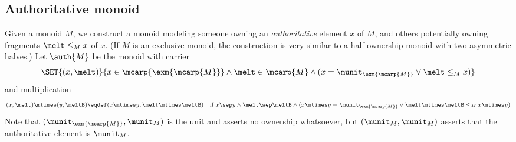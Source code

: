 %
%
%
%

\subsection{Authoritative monoid}\label{sec:auth}

Given a monoid $M$, we construct a monoid modeling someone owning an \emph{authoritative} element $x$ of $M$, and others potentially owning fragments $\melt \le_M x$ of $x$.
(If $M$ is an exclusive monoid, the construction is very similar to a half-ownership monoid with two asymmetric halves.)
Let $\auth{M}$ be the monoid with carrier
\[
	\SET{ (x, \melt) }{ x \in \mcarp{\exm{\mcarp{M}}} \land \melt \in \mcarp{M} \land (x = \munit_{\exm{\mcarp{M}}} \lor \melt \leq_M x) }
\]
and multiplication
\[
(x, \melt) \mtimes (y, \meltB) \eqdef
     (x \mtimes y, \melt \mtimes \meltB) \quad \mbox{if } x \sep y \land \melt \sep \meltB \land (x \mtimes y = \munit_{\exm{\mcarp{M}}} \lor \melt \mtimes \meltB \leq_M x \mtimes y)
\]
Note that $(\munit_{\exm{\mcarp{M}}}, \munit_M)$ is the unit and asserts no ownership whatsoever, but $(\munit_{M}, \munit_M)$ asserts that the authoritative element is $\munit_M$.

